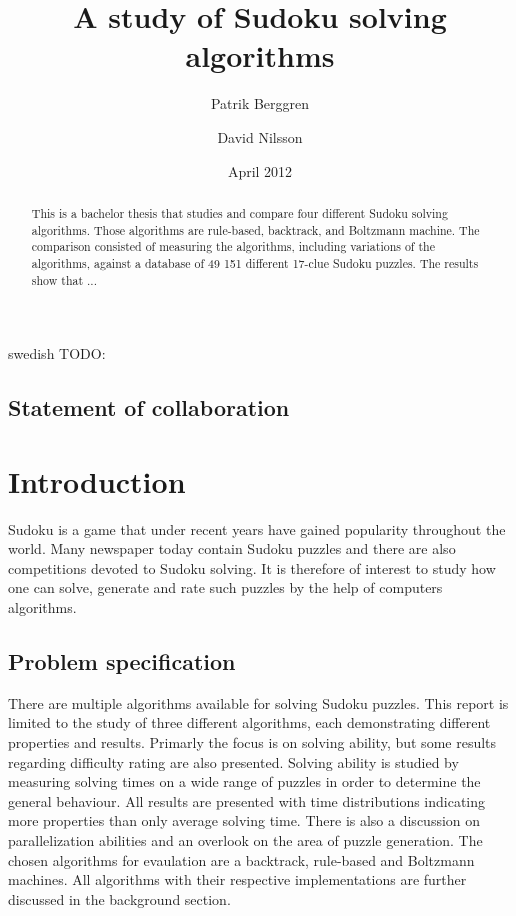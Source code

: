\documentclass[a4paper,11pt]{kth-mag}
\title{A study of Sudoku solving algorithms}
\subtitle{}
\author{Patrik Berggren \and David Nilsson}
\date{April 2012}
\begin{document}
\frontmatter
\pagestyle{empty}
\removepagenumbers
\maketitle
{}
\begin{abstract}
This is a bachelor thesis that studies and compare four different Sudoku
solving algorithms.
Those algorithms are rule-based, backtrack, and Boltzmann machine.
 The comparison consisted of measuring the algorithms, including
variations of the algorithms, against a database of 49 151 different 17-clue Sudoku
puzzles.
The results show that ...
\end{abstract}
\clearpage
\begin{foreignabstract}{swedish}
TODO: 
\end{foreignabstract}
\clearpage
\section{Statement of collaboration}
\clearpage
\tableofcontents*
\mainmatter
\pagestyle{newchap}

\chapter{Introduction}
Sudoku is a game that under recent years have gained popularity throughout the world.
Many newspaper today contain Sudoku puzzles and there are also competitions devoted 
to Sudoku solving.
It is therefore of interest to study how one can solve, generate and rate such puzzles by the help of computers algorithms.

\FloatBarrier
\section{Problem specification}
There are multiple algorithms available for solving Sudoku puzzles.
This report is limited to the study of three different algorithms, each demonstrating different properties and results.
Primarly the focus is on solving ability, but some results regarding difficulty rating are also presented.
Solving ability is studied by measuring solving times on a wide range of puzzles in order to determine the general behaviour.
All results are presented with time distributions indicating more properties than only average solving time.
There is also a discussion on parallelization abilities and an overlook on the area of puzzle generation.
The chosen algorithms for evaulation are a backtrack, rule-based and Boltzmann machines.
All algorithms with their respective implementations are further discussed in the background section.
\end{document}
